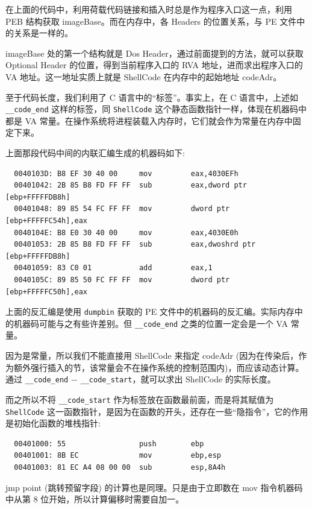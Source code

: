 \documentclass[UTF8]{ctexart}
\begin{document}
    在上面的代码中，利用荷载代码链接和插入时总是作为程序入口这一点，利用 PEB 结构获取 imageBase。而在内存中，各 Headers 的位置关系，与 PE 文件中的关系是一样的。
    
    imageBase 处的第一个结构就是 Dos Header，通过前面提到的方法，就可以获取 Optional Header 的位置，得到当前程序入口的 RVA 地址，进而求出程序入口的 VA 地址。这一地址实质上就是 ShellCode 在内存中的起始地址 codeAdr。

    至于代码长度，我们利用了 C 语言中的``标签''。事实上，在 C 语言中，上述如 \lstinline{__code_end} 这样的标签，同 \lstinline{ShellCode} 这个静态函数指针一样，体现在机器码中都是 VA 常量。在操作系统将进程装载入内存时，它们就会作为常量在内存中固定下来。
    
    上面那段代码中间的内联汇编生成的机器码如下:

    \begin{lstlisting}
  0040103D: B8 EF 30 40 00     mov         eax,4030EFh
  00401042: 2B 85 B8 FD FF FF  sub         eax,dword ptr [ebp+FFFFFDB8h]
  00401048: 89 85 54 FC FF FF  mov         dword ptr [ebp+FFFFFC54h],eax
  0040104E: B8 E0 30 40 00     mov         eax,4030E0h
  00401053: 2B 85 B8 FD FF FF  sub         eax,dwoshrd ptr [ebp+FFFFFDB8h]
  00401059: 83 C0 01           add         eax,1
  0040105C: 89 85 50 FC FF FF  mov         dword ptr [ebp+FFFFFC50h],eax
    \end{lstlisting}
    
    上面的反汇编是使用 \verb|dumpbin| 获取的 PE 文件中的机器码的反汇编。实际内存中的机器码可能与之有些许差别。但 \lstinline{__code_end} 之类的位置一定会是一个 VA 常量。
    
    因为是常量，所以我们不能直接用 ShellCode 来指定 codeAdr (因为在传染后，作为额外强行插入的节，该常量会不在操作系统的控制范围内)，而应该动态计算。通过 \lstinline{__code_end} $-$ \lstinline{__code_start}，就可以求出 ShellCode 的实际长度。

    而之所以不将 \lstinline{__code_start} 作为标签放在函数最前面，而是将其赋值为 \lstinline{ShellCode} 这一函数指针，是因为在函数的开头，还存在一些``隐指令''，它的作用是初始化函数的堆栈指针:

    \begin{lstlisting}
  00401000: 55                 push        ebp
  00401001: 8B EC              mov         ebp,esp
  00401003: 81 EC A4 08 00 00  sub         esp,8A4h
    \end{lstlisting}

    jmp point (跳转预留字段) 的计算也是同理。只是由于立即数在 mov 指令机器码中从第 8 位开始，所以计算偏移时需要自加一。
\end{document}
